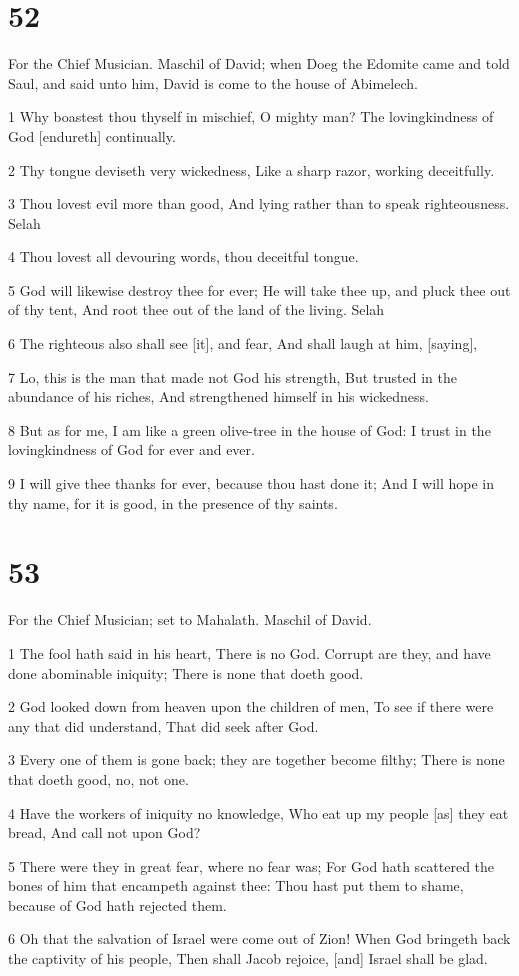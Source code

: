 \chapter{52}

\par For the Chief Musician. Maschil of David; when Doeg the Edomite came and told Saul, and said unto him, David is come to the house of Abimelech.

\par 1 Why boastest thou thyself in mischief, O mighty man? The lovingkindness of God [endureth] continually.
\par 2 Thy tongue deviseth very wickedness, Like a sharp razor, working deceitfully.
\par 3 Thou lovest evil more than good, And lying rather than to speak righteousness. Selah
\par 4 Thou lovest all devouring words, thou deceitful tongue.
\par 5 God will likewise destroy thee for ever; He will take thee up, and pluck thee out of thy tent, And root thee out of the land of the living. Selah
\par 6 The righteous also shall see [it], and fear, And shall laugh at him, [saying],
\par 7 Lo, this is the man that made not God his strength, But trusted in the abundance of his riches, And strengthened himself in his wickedness.
\par 8 But as for me, I am like a green olive-tree in the house of God: I trust in the lovingkindness of God for ever and ever.
\par 9 I will give thee thanks for ever, because thou hast done it; And I will hope in thy name, for it is good, in the presence of thy saints.

\chapter{53}

\par For the Chief Musician; set to Mahalath. Maschil of David.

\par 1 The fool hath said in his heart, There is no God. Corrupt are they, and have done abominable iniquity; There is none that doeth good.
\par 2 God looked down from heaven upon the children of men, To see if there were any that did understand, That did seek after God.
\par 3 Every one of them is gone back; they are together become filthy; There is none that doeth good, no, not one.
\par 4 Have the workers of iniquity no knowledge, Who eat up my people [as] they eat bread, And call not upon God?
\par 5 There were they in great fear, where no fear was; For God hath scattered the bones of him that encampeth against thee: Thou hast put them to shame, because of God hath rejected them.
\par 6 Oh that the salvation of Israel were come out of Zion! When God bringeth back the captivity of his people, Then shall Jacob rejoice, [and] Israel shall be glad.

